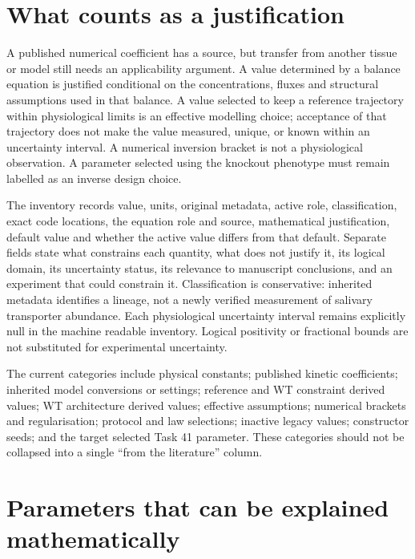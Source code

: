 \documentclass[11pt,a4paper]{article}
\begin{document}
\section{What counts as a justification}
A published numerical coefficient has a source, but transfer from another tissue or model still needs an applicability argument. A value determined by a balance equation is justified conditional on the concentrations, fluxes and structural assumptions used in that balance. A value selected to keep a reference trajectory within physiological limits is an effective modelling choice; acceptance of that trajectory does not make the value measured, unique, or known within an uncertainty interval. A numerical inversion bracket is not a physiological observation. A parameter selected using the knockout phenotype must remain labelled as an inverse design choice.

The inventory records value, units, original metadata, active role, classification, exact code locations, the equation role and source, mathematical justification, default value and whether the active value differs from that default. Separate fields state what constrains each quantity, what does not justify it, its logical domain, its uncertainty status, its relevance to manuscript conclusions, and an experiment that could constrain it. Classification is conservative: inherited metadata identifies a lineage, not a newly verified measurement of salivary transporter abundance. Each physiological uncertainty interval remains explicitly null in the machine readable inventory. Logical positivity or fractional bounds are not substituted for experimental uncertainty.

The current categories include physical constants; published kinetic coefficients; inherited model conversions or settings; reference and WT constraint derived values; WT architecture derived values; effective assumptions; numerical brackets and regularisation; protocol and law selections; inactive legacy values; constructor seeds; and the target selected Task 41 parameter. These categories should not be collapsed into a single ``from the literature'' column.

\section{Parameters that can be explained mathematically}
\end{document}
